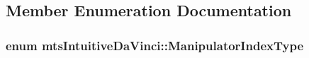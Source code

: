 \subsection{Member Enumeration Documentation}
\hypertarget{classmts_intuitive_da_vinci_a32a63e2057b2c00c8f08685f8f5736f4}{
\subsubsection[{Manipulator\-Index\-Type}]{\setlength{\rightskip}{0pt plus 5cm}enum {\bf mts\-Intuitive\-Da\-Vinci\-::\-Manipulator\-Index\-Type}}}\label{classmts_intuitive_da_vinci_a32a63e2057b2c00c8f08685f8f5736f4}

